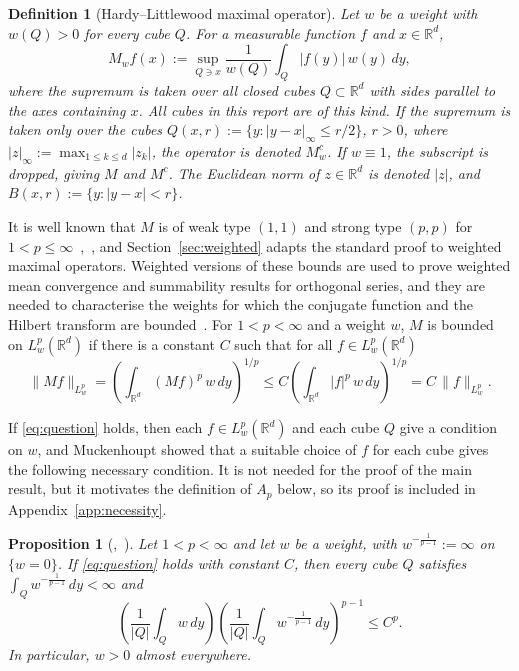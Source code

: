 \documentclass[12pt]{article}
\newtheorem{proposition}{Proposition}
\newtheorem{definition}{Definition}
\begin{document}
\begin{definition}[Hardy--Littlewood maximal operator]\label{def:maximal}
Let $w$ be a weight with $w(Q) > 0$ for every cube $Q$. For a measurable function $f$ and $x \in \mathbb{R}^d$,
\[
  M_w f(x) := \sup_{Q \ni x} \frac{1}{w(Q)} \int_Q |f(y)|\, w(y)\,dy,
\]
where the supremum is taken over all closed cubes $Q \subset \mathbb{R}^d$ with sides parallel to the axes containing $x$. All cubes in this report are of this kind. If the supremum is taken only over the cubes $Q(x,r) := \{y : |y - x|_\infty \le r/2\}$, $r > 0$, where $|z|_\infty := \max_{1 \le k \le d} |z_k|$, the operator is denoted $M^c_w$. If $w \equiv 1$, the subscript is dropped, giving $M$ and $M^c$. The Euclidean norm of $z \in \mathbb{R}^d$ is denoted $|z|$, and $B(x,r) := \{y : |y - x| < r\}$.
\end{definition}

It is well known that $M$ is of weak type $(1,1)$ and strong type $(p,p)$ for $1 < p \le \infty$~\cite[Section~2.1]{GrafakosClassical},~\cite[Theorem~1.1]{Duoandikoetxea2013}, and Section~\ref{sec:weighted} adapts the standard proof to weighted maximal operators. Weighted versions of these bounds are used to prove weighted mean convergence and summability results for orthogonal series, and they are needed to characterise the weights for which the conjugate function and the Hilbert transform are bounded~\cite[Section~1]{Muckenhoupt1972}. For $1 < p < \infty$ and a weight $w$, $M$ is bounded on $L^p_w(\mathbb{R}^d)$ if there is a constant $C$ such that for all $f \in L^p_w(\mathbb{R}^d)$
\begin{equation}\label{eq:question}
  \|Mf\|_{L^p_w} = \left( \int_{\mathbb{R}^d} (Mf)^p\, w\,dy \right)^{1/p} \le C \left( \int_{\mathbb{R}^d} |f|^p\, w\,dy \right)^{1/p} = C\, \|f\|_{L^p_w} .
\end{equation}

If \eqref{eq:question} holds, then each $f \in L^p_w(\mathbb{R}^d)$ and each cube $Q$ give a condition on $w$, and Muckenhoupt showed that a suitable choice of $f$ for each cube gives the following necessary condition. It is not needed for the proof of the main result, but it motivates the definition of $A_p$ below, so its proof is included in Appendix~\ref{app:necessity}.

\begin{proposition}[{\cite[Theorem~9]{Muckenhoupt1972},~\cite[proof of Theorem~1.7]{Duoandikoetxea2013}}]\label{prop:necessity}
Let $1 < p < \infty$ and let $w$ be a weight, with $w^{-\frac{1}{p-1}} := \infty$ on $\{w = 0\}$. If \eqref{eq:question} holds with constant $C$, then every cube $Q$ satisfies $\int_Q w^{-\frac{1}{p-1}}\,dy < \infty$ and
\[
  \left( \frac{1}{|Q|} \int_Q w\,dy \right) \left( \frac{1}{|Q|} \int_Q w^{-\frac{1}{p-1}}\,dy \right)^{p-1} \le C^p .
\]
In particular, $w > 0$ almost everywhere.
\end{proposition}
\end{document}
